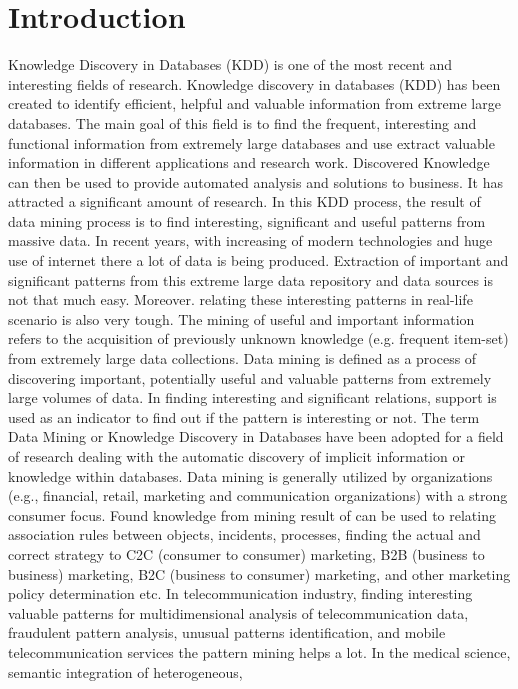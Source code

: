 \documentclass[conference]{IEEEtran}
\begin{document}




%
\IEEEpeerreviewmaketitle



\section{Introduction}

Knowledge Discovery in Databases (KDD) is one of the most recent and interesting fields of research. Knowledge discovery in databases (KDD) has been created to identify efficient, helpful and valuable information from extreme large databases. The main goal of this field is to find the frequent, interesting and functional information from extremely large databases and use extract valuable information in different applications and research work. Discovered Knowledge can then be used to provide automated analysis and solutions to business. It has attracted a significant amount of research. In this KDD process, the result of data mining process is to find interesting, significant and useful patterns from massive data. In recent years, with increasing of modern technologies and huge use of internet there a lot of data is being produced. Extraction of important and significant patterns from this extreme large data repository and data sources is not that much easy. Moreover. relating these interesting patterns in real-life scenario is also very tough. The mining of useful and important information refers to the acquisition of previously unknown knowledge (e.g. frequent item-set) from extremely large data collections. Data mining is defined as a process of discovering important, potentially useful and valuable patterns from extremely large volumes of data. In finding interesting and significant relations, support is used as an indicator to find out if the pattern is interesting or not. The term Data Mining or Knowledge Discovery in Databases have been adopted for a field of research dealing with the automatic discovery of implicit information or knowledge within databases. Data mining is generally utilized by organizations (e.g., financial, retail, marketing and communication organizations) with a strong consumer focus. Found knowledge from mining result of can be used to relating association rules between objects, incidents, processes, finding the actual and correct strategy to C2C (consumer to consumer) marketing, B2B (business to business) marketing, B2C (business to consumer) marketing, and other marketing policy determination etc. In telecommunication industry, finding interesting valuable patterns for multidimensional analysis of telecommunication data, fraudulent pattern analysis, unusual patterns identification, and mobile telecommunication services the pattern mining helps a lot. In the medical science, semantic integration of heterogeneous, 
\end{document}
